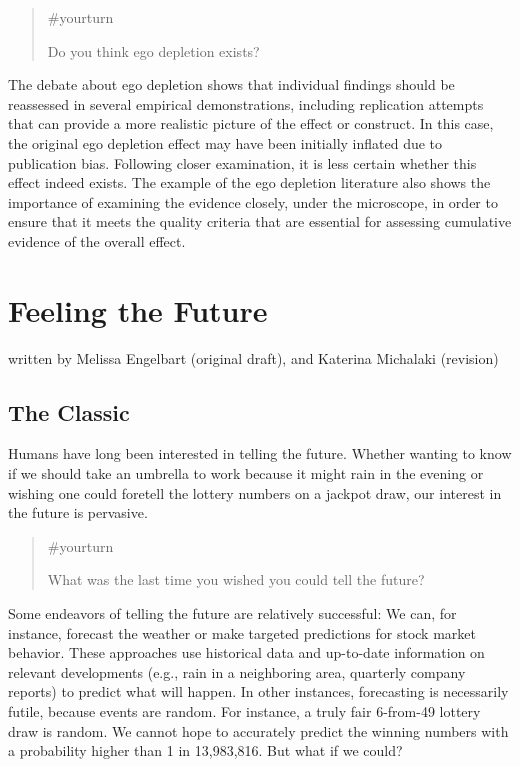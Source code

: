 \documentclass[
  letterpaper,
]{book}
\begin{document}
\begin{quote}
{\#yourturn}

Do you think ego depletion exists?
\end{quote}

The debate about ego depletion shows that individual findings should be
reassessed in several empirical demonstrations, including replication
attempts that can provide a more realistic picture of the effect or
construct. In this case, the original ego depletion effect may have been
initially inflated due to publication bias. Following closer
examination, it is less certain whether this effect indeed exists. The
example of the ego depletion literature also shows the importance of
examining the evidence closely, under the microscope, in order to ensure
that it meets the quality criteria that are essential for assessing
cumulative evidence of the overall effect.


\chapter{\texorpdfstring{{Feeling the
Future}}{Feeling the Future}}\label{feeling-the-future}

{written by Melissa Engelbart (original draft), and Katerina Michalaki
(revision)}

\section{The Classic}\label{the-classic-5}

Humans have long been interested in telling the future. Whether wanting
to know if we should take an umbrella to work because it might rain in
the evening or wishing one could foretell the lottery numbers on a
jackpot draw, our interest in the future is pervasive.

\begin{quote}
{\#yourturn}

What was the last time you wished you could tell the future?
\end{quote}

Some endeavors of telling the future are relatively successful: We can,
for instance, forecast the weather or make targeted predictions for
stock market behavior. These approaches use historical data and
up-to-date information on relevant developments (e.g., rain in a
neighboring area, quarterly company reports) to predict what will
happen. In other instances, forecasting is necessarily futile, because
events are random. For instance, a truly fair 6-from-49 lottery draw is
random. We cannot hope to accurately predict the winning numbers with a
probability higher than 1 in 13,983,816. But what if we could?
\end{document}
